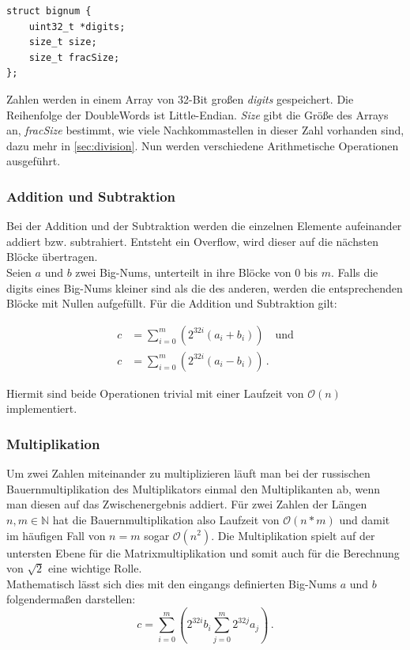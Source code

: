 \documentclass[course=erap]{aspdoc}
\begin{document}
\begin{lstlisting}
struct bignum {
    uint32_t *digits;
    size_t size;
    size_t fracSize;
};
\end{lstlisting}

Zahlen werden in einem Array von 32-Bit großen \textit{digits} gespeichert. Die Reihenfolge der DoubleWords ist Little-Endian. \textit{Size} gibt die Größe des Arrays an, \textit{fracSize} bestimmt, 
wie viele Nachkommastellen in dieser Zahl vorhanden sind, dazu mehr in \ref{sec:division}. Nun werden verschiedene Arithmetische Operationen ausgeführt.

\subsubsection*{Addition und Subtraktion}
Bei der Addition und der Subtraktion werden die einzelnen Elemente aufeinander addiert bzw. subtrahiert. Entsteht ein Overflow, wird dieser auf die nächsten Blöcke übertragen. \\
Seien $a$ und $b$ zwei Big-Nums, unterteilt in ihre Blöcke von $0$ bis $m$. Falls die digits eines Big-Nums kleiner sind als die des anderen, werden die entsprechenden Blöcke mit Nullen aufgefüllt. 
Für die Addition und Subtraktion gilt:

\begin{align}
  c &= \sum_{i=0}^m \left(2^{32i} (a_i + b_i)\right) \quad  \text{und} \label{eq:bignum_addition} \\
  c &= \sum_{i=0}^m \left(2^{32i} (a_i - b_i)\right) \, .          \label{eq:bignum_subtraktion}
\end{align}

Hiermit sind beide Operationen trivial mit einer Laufzeit von $\mathcal{O}(n)$ implementiert.

\subsubsection*{Multiplikation}
Um zwei Zahlen miteinander zu multiplizieren läuft man bei der russischen Bauernmultiplikation des Multiplikators einmal den Multiplikanten ab, wenn man diesen auf das Zwischenergebnis addiert. 
Für zwei Zahlen der Längen $n, m \in\mathbb{N}$ hat die Bauernmultiplikation also Laufzeit von $\mathcal{O}(n*m)$ und damit im häufigen Fall von $n=m$ sogar $\mathcal{O}(n^2)$.
Die Multiplikation spielt auf der untersten Ebene für die Matrixmultiplikation und somit auch für die Berechnung von $\sqrt{2}$ eine wichtige Rolle.\\
Mathematisch lässt sich dies mit den eingangs definierten Big-Nums $a$ und $b$ folgendermaßen darstellen:
\begin{equation}
  c = \sum_{i=0}^m \left(2^{32i} b_i \sum_{j=0}^m 2^{32j}a_j\right) \, .
\end{equation}
\end{document}

